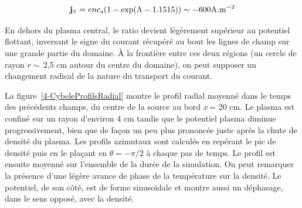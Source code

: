 \begin{refsection}
\begin{equation}
\mathbf j_\para=enc_s(1-\exp(\Lambda-1.1515))\sim -600\text{A.m}\puissance{-2}
\end{equation}

En dehors du plasma central, le ratio devient légèrement supérieur
au potentiel flottant, inversant le signe du courant récupéré au bout les lignes
de champ sur une grande partie du domaine. À la frontière entre ces
deux régions (un cercle de rayon $r\sim\,$2,5 cm autour du centre du domaine),
on peut supposer un changement radical de la nature du transport du courant.

La figure~\ref{4-CybeleProfilsRadial} montre le profil radial moyenné dans le
temps des précédents champs, du centre de la source au bord $x\,$= 20 cm. Le
plasma est confiné sur un rayon d'environ 4 cm tandis que le potentiel plasma
diminue progressivement, bien que de façon un peu plus prononcée juste après la
chute de densité du plasma. 
Les profils azimutaux sont calculés en repérant le pic de
densité puis en le plaçant en $\theta=-\pi/2$ à chaque pas de temps. Le profil
est ensuite moyenné sur l'ensemble de la durée de la simulation.
On peut remarquer la présence d'une légère avance de phase de la température
sur la densité. Le potentiel, de son côté, est de forme sinusoïdale et montre
aussi un déphasage, dans le sens opposé, avec la densité.


\end{refsection}
